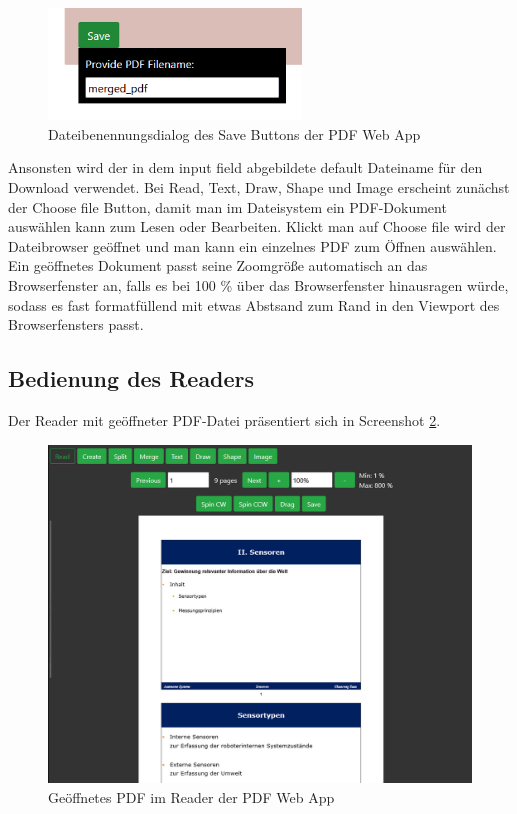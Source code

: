 \begin{figure}[!htbp]
	\centering
	\includegraphics[width=0.6\textwidth]{"images/save.png"}
	\caption{Dateibenennungsdialog des Save Buttons der PDF Web App}
	\label{fig:save}
\end{figure}

Ansonsten wird der in dem input field abgebildete default Dateiname für den Download verwendet. Bei Read, Text, Draw, Shape und Image erscheint zunächst der Choose file Button, damit man im Dateisystem ein PDF-Dokument auswählen kann zum Lesen oder Bearbeiten. Klickt man auf Choose file wird der Dateibrowser geöffnet und man kann ein einzelnes PDF zum Öffnen auswählen. Ein geöffnetes Dokument passt seine Zoomgröße automatisch an das Browserfenster an, falls es bei 100 \% über das Browserfenster hinausragen würde, sodass es fast formatfüllend mit etwas Abstsand zum Rand in den Viewport des Browserfensters passt. 


\subsection{Bedienung des Readers}
Der Reader mit geöffneter PDF-Datei präsentiert sich in Screenshot \ref{fig:reader}.

\begin{figure}[!htbp]
	\centering
	\includegraphics[width=1\textwidth]{"images/reader.png"}
	\caption{Geöffnetes PDF im Reader der PDF Web App}
	\label{fig:reader}
\end{figure}

